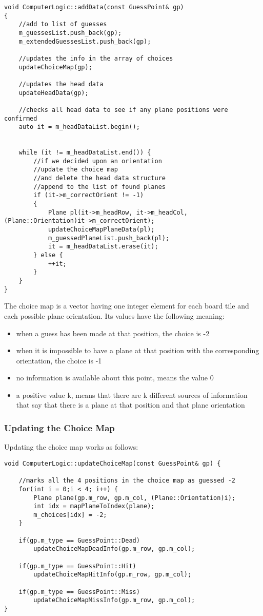 \begin{lstlisting}
void ComputerLogic::addData(const GuessPoint& gp)
{
	//add to list of guesses
	m_guessesList.push_back(gp);
	m_extendedGuessesList.push_back(gp);
	
	//updates the info in the array of choices
	updateChoiceMap(gp);
	
	//updates the head data
	updateHeadData(gp);
	
	//checks all head data to see if any plane positions were confirmed
	auto it = m_headDataList.begin();
	
	
	while (it != m_headDataList.end()) {
		//if we decided upon an orientation
		//update the choice map
		//and delete the head data structure
		//append to the list of found planes
		if (it->m_correctOrient != -1)
		{
			Plane pl(it->m_headRow, it->m_headCol, (Plane::Orientation)it->m_correctOrient);
			updateChoiceMapPlaneData(pl);
			m_guessedPlaneList.push_back(pl);
			it = m_headDataList.erase(it);
		} else {
			++it;
		}
	}
}
\end{lstlisting}

The choice map is a vector having one integer element for each board tile and each possible plane orientation. Its values have the following meaning:

\begin{itemize}
	\item when a guess has been made at that position, the choice is -2
	\item when it is impossible to have a plane at that position with the corresponding orientation, the choice is -1
	\item no information is available about this point, means the value 0
	\item a positive value k, means that there are k different sources of information that say that there is a plane at that position and that plane orientation
\end{itemize}

\subsubsection{Updating the Choice Map}

Updating the choice map works as follows:

\begin{lstlisting}
void ComputerLogic::updateChoiceMap(const GuessPoint& gp) {

	//marks all the 4 positions in the choice map as guessed -2
	for(int i = 0;i < 4; i++) {
		Plane plane(gp.m_row, gp.m_col, (Plane::Orientation)i);
		int idx = mapPlaneToIndex(plane);
		m_choices[idx] = -2;
	}
	
	if(gp.m_type == GuessPoint::Dead)
		updateChoiceMapDeadInfo(gp.m_row, gp.m_col);
	
	if(gp.m_type == GuessPoint::Hit)
		updateChoiceMapHitInfo(gp.m_row, gp.m_col);
	
	if(gp.m_type == GuessPoint::Miss)
		updateChoiceMapMissInfo(gp.m_row, gp.m_col);
}
\end{lstlisting}

